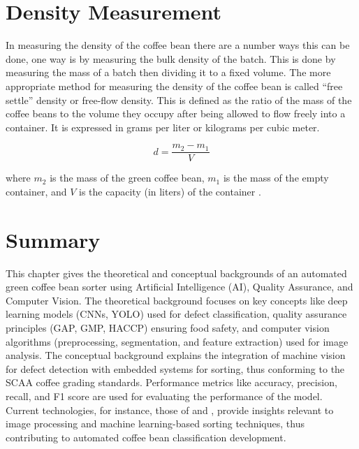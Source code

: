 \section{Density Measurement}
In measuring the density of the coffee bean there are a number ways this can be done, one way is by measuring the bulk density of the batch. This is done by measuring the mass of a batch then dividing it to a fixed volume. The more appropriate method for measuring the density of the coffee bean is called “free settle” density or free-flow density. This is defined as the ratio of the mass of the coffee beans to the volume they occupy after being allowed to flow freely into a container. It is expressed in grams per liter or kilograms per cubic meter. 

\begin{equation}
	d = \frac{m_2-m_1}{V}
\end{equation}

where $m_2$ is the mass of the green coffee bean, $m_1$ is the mass of the empty container, and $V$ is the capacity (in liters) of the container \cite{International_Organization_for_Standardization_1995}.

\section{Summary}
This chapter gives the theoretical and conceptual backgrounds of an automated green coffee bean sorter using Artificial Intelligence (AI), Quality Assurance, and Computer Vision. The theoretical background focuses on key concepts like deep learning models (CNNs, YOLO) used for defect classification, quality assurance principles (GAP, GMP, HACCP) ensuring food safety, and computer vision algorithms (preprocessing, segmentation, and feature extraction) used for image analysis. The conceptual background explains the integration of machine vision for defect detection with embedded systems for sorting, thus conforming to the SCAA coffee grading standards. Performance metrics like accuracy, precision, recall, and F1 score are used for evaluating the performance of the model. Current technologies, for instance, those of \cite{Lualhati_Mariano_Torres_Fenol_2022} and \cite{Balay_Cabrera_Jensen_Mayuga_2024}, provide insights relevant to image processing and machine learning-based sorting techniques, thus contributing to automated coffee bean classification development.
